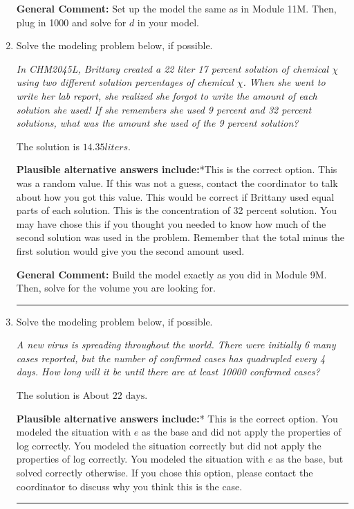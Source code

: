 \documentclass{extbook}[14pt]
\newcommand{\litem}[1]{\item #1

\rule{\textwidth}{0.4pt}}
\begin{document}
\begin{enumerate}
{\textbf{General Comment:} Set up the model the same as in Module 11M. Then, plug in 1000 and solve for $d$ in your model.
}
\litem{
Solve the modeling problem below, if possible.

\begin{center}
    \textit{ In CHM2045L, Brittany created a 22 liter 17 percent solution of chemical $\chi$ using two different solution percentages of chemical $\chi$. When she went to write her lab report, she realized she forgot to write the amount of each solution she used! If she remembers she used 9 percent and 32 percent solutions, what was the amount she used of the 9 percent solution? }
\end{center}
The solution is \( 14.35 liters \).\begin{enumerate}[label=\Alph*.]
\textbf{Plausible alternative answers include:}*This is the correct option.
This was a random value. If this was not a guess, contact the coordinator to talk about how you got this value.
This would be correct if Brittany used equal parts of each solution.
This is the concentration of 32 percent solution.
You may have chose this if you thought you needed to know how much of the second solution was used in the problem. Remember that the total minus the first solution would give you the second amount used.
\end{enumerate}

\textbf{General Comment:} Build the model exactly as you did in Module 9M. Then, solve for the volume you are looking for.
}
\litem{
Solve the modeling problem below, if possible.

\begin{center}
    \textit{ A new virus is spreading throughout the world. There were initially 6 many cases reported, but the number of confirmed cases has quadrupled every 4 days. How long will it be until there are at least 10000 confirmed cases? }
\end{center}
The solution is \( \text{About } 22 \text{ days} \).\begin{enumerate}[label=\Alph*.]
\textbf{Plausible alternative answers include:}* This is the correct option.
You modeled the situation with $e$ as the base and did not apply the properties of log correctly.
You modeled the situation correctly but did not apply the properties of log correctly.
You modeled the situation with $e$ as the base, but solved correctly otherwise.
If you chose this option, please contact the coordinator to discuss why you think this is the case.
\end{enumerate}

}
\end{enumerate}
\end{document}
